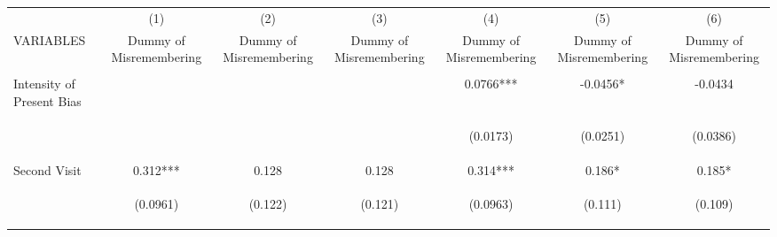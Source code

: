 \begin{center}
\begin{tabular}{lcccccc} \hline
 & (1) & (2) & (3) & (4) & (5) & (6) \\
VARIABLES & Dummy of Misremembering & Dummy of Misremembering & Dummy of Misremembering & Dummy of Misremembering & Dummy of Misremembering & Dummy of Misremembering \\ \hline
\vspace{4pt} & \begin{footnotesize}\end{footnotesize} & \begin{footnotesize}\end{footnotesize} & \begin{footnotesize}\end{footnotesize} & \begin{footnotesize}\end{footnotesize} & \begin{footnotesize}\end{footnotesize} & \begin{footnotesize}\end{footnotesize} \\
Intensity of Present Bias &  &  &  & 0.0766*** & -0.0456* & -0.0434 \\
\vspace{4pt} & \begin{footnotesize}\end{footnotesize} & \begin{footnotesize}\end{footnotesize} & \begin{footnotesize}\end{footnotesize} & \begin{footnotesize}(0.0173)\end{footnotesize} & \begin{footnotesize}(0.0251)\end{footnotesize} & \begin{footnotesize}(0.0386)\end{footnotesize} \\
Second Visit & 0.312*** & 0.128 & 0.128 & 0.314*** & 0.186* & 0.185* \\
\vspace{4pt} & \begin{footnotesize}(0.0961)\end{footnotesize} & \begin{footnotesize}(0.122)\end{footnotesize} & \begin{footnotesize}(0.121)\end{footnotesize} & \begin{footnotesize}(0.0963)\end{footnotesize} & \begin{footnotesize}(0.111)\end{footnotesize} & \begin{footnotesize}(0.109)\end{footnotesize} \\

\end{tabular}
\end{center}
